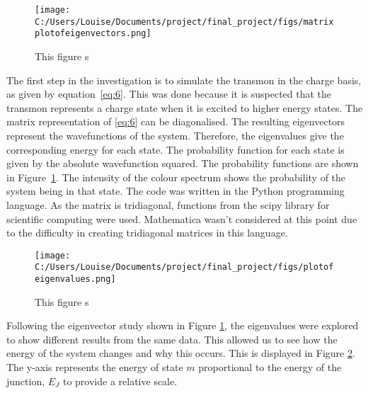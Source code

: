 \documentclass[11pt]{article}
\begin{document}
\begin{figure}[ht]
\centering
\texttt{[image: C:/Users/Louise/Documents/project/final\_project/figs/matrixplotofeigenvectors.png]}
\caption{This figure s}
\label{fig:graph1}
\end{figure}
The first step in the investigation is to simulate the transmon in the charge basis, as given by equation~\ref{eq:6}. This was done because it is suspected that the transmon represents a charge state when it is excited to higher energy states. The matrix representation of \ref{eq:6} can be diagonalised. The resulting eigenvectors represent the wavefunctions of the system. Therefore, the eigenvalues give the corresponding energy for each state. The probability function for each state is given by the absolute wavefunction squared. The probability functions are shown in Figure~\ref{fig:graph1}. The intensity of the colour spectrum shows the probability of the system being in that state. The code was written in the Python programming language. As the matrix is tridiagonal, functions from the scipy library for scientific computing were used. Mathematica wasn't considered at this point due to the difficulty in creating tridiagonal matrices in this language.
\begin{figure}[ht]
\centering
\texttt{[image: C:/Users/Louise/Documents/project/final\_project/figs/plotofeigenvalues.png]}
\caption{This figure s}
\label{fig:graph2}
\end{figure}
Following the eigenvector study shown in Figure \ref{fig:graph1}, the eigenvalues were explored to show different results from the same data. This allowed us to see how the energy of the system changes and why this occurs. This is displayed in Figure \ref{fig:graph2}. The y-axis represents the energy of state $m$ proportional to the energy of the junction, $E_J$ to provide a relative scale.
\end{document}
